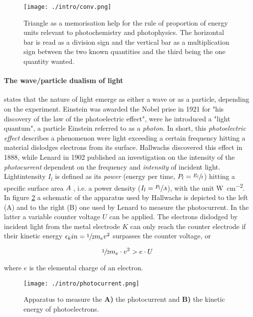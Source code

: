	\begin{figure}[h]%
		\centering
		\label{fig:conv}
		\texttt{[image: ./intro/conv.png]}
		\caption{Triangle as a memorisation help for the rule of proportion of energy units relevant to photochemistry and photophysics. The horizontal bar is read as a division sign and the vertical bar as a multiplication sign between the two known quantities and the third being the one quantity wanted.}
	\end{figure}

	\paragraph{The wave/particle dualism of light} states that the nature of light emerge as either a wave or as a particle, depending on the experiment. Einstein was awarded the Nobel prise in 1921 for "his discovery of the law of the photoelectric effect", were he introduced a "light quantum", a particle Einstein referred to as a \emph{photon}. In short, this \emph{photoelectric effect} describes a phenomenon were light exceeding a certain frequency hitting a material dislodges electrons from its surface. Hallwachs discovered this effect in 1888, while Lenard in 1902 published an investigation on the intensity of the \emph{photocurrent} dependent on the frequency and \emph{intensity} of incident light. Lightintensity $I_l$ is defined as its \emph{power} (energy per time, $P_l = \sfrac{E_l}{t}$) hitting a specific surface area $A$ , i.e. a power density ($I_l = \sfrac{P_l}{A}$), with the unit \unit{\W\per\square\cm}. In figure \ref{fig:photocurrent} a schematic of the apparatus used by Hallwachs is depicted to the left (A) and to the right (B) one used by Lenard to measure the photocurrent. In the latter a variable counter voltage $U$ can be applied. The electrons dislodged by incident light from the metal electrode $K$ can only reach the counter electrode if their kinetic energy $\epsilon_kin = \sfrac{1}{2} m_ev^2$ surpasses the counter voltage, or

	\begin{equation}[h]%
		\sfrac{1}{2}m_e\cdot v^2 > e\cdot U
	\end{equation}

	where $e$ is the elemental charge of an electron. 

	\begin{figure}[h]%
		\centering
		\label{fig:photocurrent}
		\texttt{[image: ./intro/photocurrent.png]}
		\caption{Apparatus to measure the \textbf{A)} the photocurrent and \textbf{B)} the kinetic energy of photoelectrons.}
	\end{figure}

